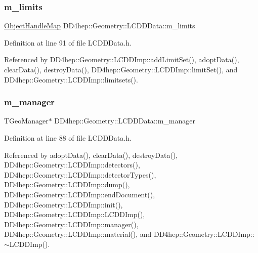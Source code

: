 \subsubsection{\texorpdfstring{m\+\_\+limits}{m\_limits}}
{\footnotesize\ttfamily \hyperlink{class_d_d4hep_1_1_geometry_1_1_l_c_d_d_data_1_1_object_handle_map}{Object\+Handle\+Map} D\+D4hep\+::\+Geometry\+::\+L\+C\+D\+D\+Data\+::m\+\_\+limits\hspace{0.3cm}{\ttfamily [protected]}}



Definition at line 91 of file L\+C\+D\+D\+Data.\+h.



Referenced by D\+D4hep\+::\+Geometry\+::\+L\+C\+D\+D\+Imp\+::add\+Limit\+Set(), adopt\+Data(), clear\+Data(), destroy\+Data(), D\+D4hep\+::\+Geometry\+::\+L\+C\+D\+D\+Imp\+::limit\+Set(), and D\+D4hep\+::\+Geometry\+::\+L\+C\+D\+D\+Imp\+::limitsets().

\hypertarget{class_d_d4hep_1_1_geometry_1_1_l_c_d_d_data_afd2dd18b9befa7e8ebb9a9ecf4faca03}{}\label{class_d_d4hep_1_1_geometry_1_1_l_c_d_d_data_afd2dd18b9befa7e8ebb9a9ecf4faca03} 
\subsubsection{\texorpdfstring{m\+\_\+manager}{m\_manager}}
{\footnotesize\ttfamily T\+Geo\+Manager$\ast$ D\+D4hep\+::\+Geometry\+::\+L\+C\+D\+D\+Data\+::m\+\_\+manager\hspace{0.3cm}{\ttfamily [protected]}}



Definition at line 88 of file L\+C\+D\+D\+Data.\+h.



Referenced by adopt\+Data(), clear\+Data(), destroy\+Data(), D\+D4hep\+::\+Geometry\+::\+L\+C\+D\+D\+Imp\+::detectors(), D\+D4hep\+::\+Geometry\+::\+L\+C\+D\+D\+Imp\+::detector\+Types(), D\+D4hep\+::\+Geometry\+::\+L\+C\+D\+D\+Imp\+::dump(), D\+D4hep\+::\+Geometry\+::\+L\+C\+D\+D\+Imp\+::end\+Document(), D\+D4hep\+::\+Geometry\+::\+L\+C\+D\+D\+Imp\+::init(), D\+D4hep\+::\+Geometry\+::\+L\+C\+D\+D\+Imp\+::\+L\+C\+D\+D\+Imp(), D\+D4hep\+::\+Geometry\+::\+L\+C\+D\+D\+Imp\+::manager(), D\+D4hep\+::\+Geometry\+::\+L\+C\+D\+D\+Imp\+::material(), and D\+D4hep\+::\+Geometry\+::\+L\+C\+D\+D\+Imp\+::$\sim$\+L\+C\+D\+D\+Imp().

